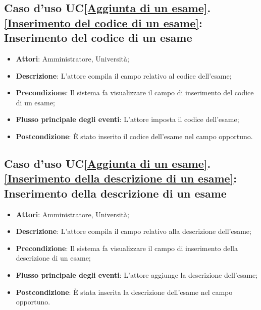 \subsection{Caso d'uso UC\ref{Aggiunta di un esame}.\ref{Inserimento del codice di un esame}: Inserimento del codice di un esame}
\begin{itemize}
	\item \textbf{Attori}: Amministratore, Università;
	\item \textbf{Descrizione}: L'attore compila il campo relativo al codice dell'esame;
	
	\item \textbf{Precondizione}: Il sistema fa visualizzare il campo di inserimento del codice di un esame;
	\item \textbf{Flusso principale degli eventi}: L'attore imposta il codice dell'esame;
	
	\item \textbf{Postcondizione}: È stato inserito il codice dell'esame nel campo opportuno.
\end{itemize}

\subsection{Caso d'uso UC\ref{Aggiunta di un esame}.\ref{Inserimento della descrizione di un esame}: Inserimento della descrizione di un esame}
\begin{itemize}
	\item \textbf{Attori}: Amministratore, Università;
	\item \textbf{Descrizione}: L'attore compila il campo relativo alla descrizione dell'esame;
	
	\item \textbf{Precondizione}: Il sistema fa visualizzare il campo di inserimento della descrizione di un esame;
	\item \textbf{Flusso principale degli eventi}: L'attore aggiunge la descrizione dell'esame;
	
	\item \textbf{Postcondizione}: È stata inserita la descrizione dell'esame nel campo opportuno.
	
\end{itemize}

